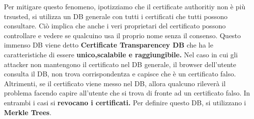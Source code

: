 \documentclass{book}
\theoremstyle{remark}
\begin{document}
Per mitigare questo fenomeno, ipotizziamo che il certificate authoritiy non è più trsusted, si utilizza un DB generale con tutti i certificati che tutti possono consultare\@. Ciò implica che anche i veri proprietari del certificato possono controllare e vedere se qualcuino usa il proprio nome senza il consenso\@. Questo immenso DB viene detto \textbf{Certificate Transparencey DB} che ha le caratteristiche di essere \textbf{unico,scalabile e raggiungibile\@.} Nel caso in cui gli attacker non mantengono il certificato nel DB generale, il browser dell'utente consulta il DB, non trova corrispondentza e capisce che è un certificato falso\@. Altrimenti, se il certificato viene messo nel DB, allora qualcuno rileverà il problema facendo capire all'utente che si trova di fronte ad un certificato falso\@. In entrambi i casi si \textbf{revocano i certificati\@.}
Per definire questo DB, si utilizzano i \textbf{Merkle Trees}\@.
\end{document}

